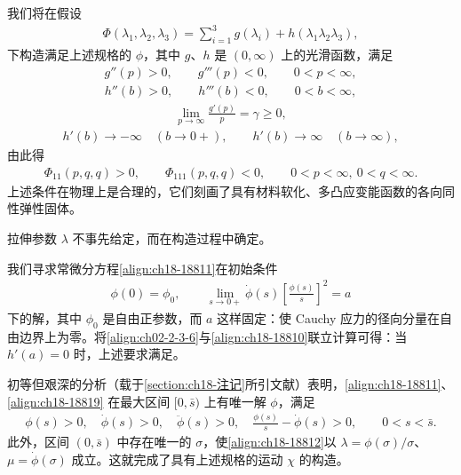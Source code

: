 \documentclass[../../main.tex]{subfiles}
\begin{document}
我们将在假设
\begin{align}
\Phi(\lambda_1,\lambda_2,\lambda_3)=\sum_{i=1}^3 g(\lambda_i)+h(\lambda_1\lambda_2\lambda_3),
\label{align:ch18-18813}
\end{align}
下构造满足上述规格的 $\phi$，其中 $g$、$h$ 是 $(0,\infty)$ 上的光滑函数，满足
\begin{align}
g''(p)>0,\qquad g'''(p)<0,\qquad 0<p<\infty,
\label{align:ch18-18814}
\end{align}
\begin{align}
h''(b)>0,\qquad h'''(b)<0,\qquad 0<b<\infty,
\label{align:ch18-18815}
\end{align}
\begin{align}
\lim_{p\to\infty}\frac{g'(p)}{p}=\gamma\geqslant0,
\label{align:ch18-18816}
\end{align}
\begin{align}
h'(b)\to-\infty\quad(b\to0+),\qquad h'(b)\to\infty\quad(b\to\infty),
\label{align:ch18-18817}
\end{align}
由此得
\begin{align}
\Phi_{11}(p,q,q)>0,\qquad \Phi_{111}(p,q,q)<0,\qquad 0<p<\infty,\ 0<q<\infty.
\label{align:ch18-18818}
\end{align}
上述条件在物理上是合理的，它们刻画了具有材料软化、多凸应变能函数的各向同性弹性固体。

拉伸参数 $\lambda$ 不事先给定，而在构造过程中确定。

我们寻求常微分方程\eqref{align:ch18-18811}在初始条件
\begin{align}
\phi(0)=\phi_0,\qquad \lim_{s\to0+}\dot\phi(s)\left[\frac{\phi(s)}{s}\right]^2=a
\label{align:ch18-18819}
\end{align}
下的解，其中 $\phi_0$ 是自由正参数，而 $a$ 这样固定：使 Cauchy 应力的径向分量在自由边界上为零。将\eqref{align:ch02-2-3-6}与\eqref{align:ch18-18810}联立计算可得：当 $h'(a)=0$ 时，上述要求满足。

初等但艰深的分析（载于\cref{section:ch18-注记}所引文献）表明，\eqref{align:ch18-18811}、\eqref{align:ch18-18819} 在最大区间 $[0,\bar s)$ 上有唯一解 $\phi$，满足
\begin{align}
\phi(s)>0,\quad \dot\phi(s)>0,\quad \ddot\phi(s)>0,\quad \frac{\phi(s)}{s}-\dot\phi(s)>0,\qquad 0<s<\bar s.
\label{align:ch18-18820}
\end{align}
此外，区间 $(0,\bar s)$ 中存在唯一的 $\sigma$，使\eqref{align:ch18-18812}以 $\lambda=\phi(\sigma)/\sigma$、$\mu=\dot\phi(\sigma)$ 成立。这就完成了具有上述规格的运动 $\chi$ 的构造。
\end{document}
